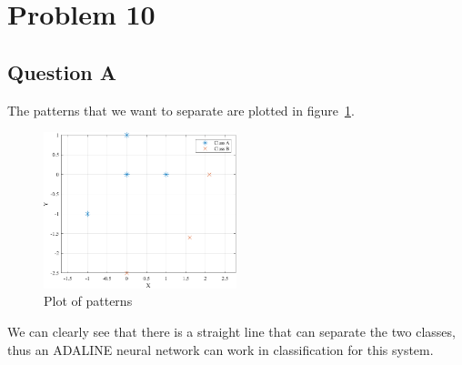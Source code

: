 \section{Problem 10}

\subsection{Question A}

The patterns that we want to separate are plotted in figure~\ref{fig:prob_10_patterns}.

\begin{figure}[htpb]
	\centering
	\includegraphics[width=0.5\textwidth]{../Problem 10/patterns.pdf}
	\caption{Plot of patterns}
	\label{fig:prob_10_patterns}
\end{figure}

We can clearly see that there is a straight line that can separate the two classes, thus an ADALINE neural network can work in classification for this system.